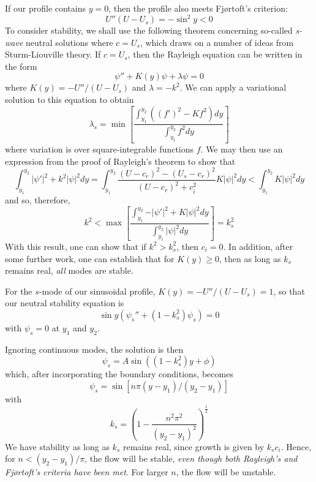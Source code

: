 \documentclass[letterpaper, 11pt, onecolumn]{article}
\begin{document}
If our profile contains $y = 0$, then the profile also meets Fj\o rtoft's criterion:
\begin{equation*}
U''(U - U_s) = - \sin^2 y < 0
\end{equation*}
To consider stability, we shall use the following theorem concerning so-called \emph{s-wave} neutral solutions where $c = U_s$, which draws on a number of ideas from Sturm-Liouville theory. If $c = U_s$, then the Rayleigh equation can be written in the form
\begin{equation*}
\psi'' + K(y) \psi + \lambda \psi = 0
\end{equation*}
where $K(y) = -U'' / (U - U_s)$ and $\lambda = -k^2$. We can apply a variational solution to this equation to obtain
\begin{equation*}
\lambda_s = \min\left[\frac{\int_{y_1}^{y_2} \left((f')^2 - K f^2\right) dy} {\int_{y_1}^{y_2} f^2 dy} \right]
\end{equation*}
where variation is over square-integrable functions $f$. We may then use an expression from the proof of Rayleigh's theorem to show that
\begin{equation*}
\int_{y_1}^{y_2} \vert \psi' \vert^2 + k^2 \vert \psi \vert^2 dy = \int_{y_1}^{y_2} \frac{(U - c_r)^2 - (U_s - c_r)^2}{(U - c_r)^2 + c_i^2} K \vert \psi \vert^2 dy < \int_{y_1}^{y_2} K \vert \psi \vert^2 dy
\end{equation*}
and so, therefore,
\begin{equation}
k^2 < \max\left[\frac{\int_{y_1}^{y_2} - \vert \psi' \vert^2 + K \vert \psi \vert^2 dy}{\int_{y_1}^{y_2} \vert \psi \vert^2 dy} \right] = k_s^2
\end{equation}
With this result, one can show that if $k^2 > k_s^2$, then $c_i = 0$. In addition, after some further work, one can establish that for $K(y) \geq 0$, then as long as $k_s$ remains real, \emph{all} modes are stable.

For the $s$-mode of our sinusoidal profile, $K(y) = -U'' / (U - U_s) = 1$, so that our neutral stability equation is
\begin{equation*}
\sin y \left(\psi_s'' + (1 - k_s^2) \psi_s \right) = 0
\end{equation*}
with $\psi_s = 0$ at $y_1$ and $y_2$.

Ignoring continuous modes, the solution is then
\begin{equation*}
\psi_s = A \sin((1 - k_s^2) y + \phi)
\end{equation*}
which, after incorporating the boundary conditions, becomes
\begin{equation*}
\psi_s = \sin\left[n \pi (y - y_1) / (y_2 - y_1)\right]
\end{equation*}
with
\begin{equation*}
k_s = \left(1 - \frac{n^2 \pi^2}{(y_2 - y_1)^2} \right)^{\frac{1}{2}}
\end{equation*}
We have stability as long as $k_s$ remains real, since growth is given by $k_s c_i$. Hence, for $n < (y_2 - y_1) / \pi$, the flow will be stable, \emph{even though both Rayleigh's and Fj\o rtoft's criteria have been met}. For larger $n$, the flow will be unstable.
\end{document}
